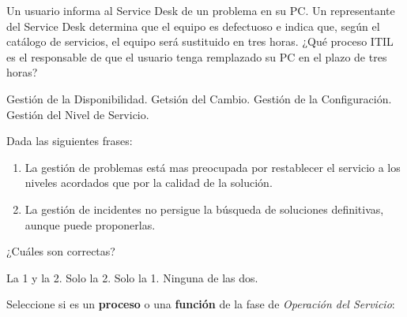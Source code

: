 \documentclass[a4paper]{exam}
\begin{document}
\begin{questions}
  \question Un usuario informa al Service Desk de un problema en su
  PC. Un representante del Service Desk determina que el equipo es
  defectuoso e indica que, según el catálogo de servicios, el equipo
  será sustituido en tres horas. ¿Qué proceso ITIL es el responsable
  de que el usuario tenga remplazado su PC en el plazo de tres horas?

  \begin{checkboxes}
    \choice Gestión de la Disponibilidad.
    \CorrectChoice Getsión del Cambio.
    \choice Gestión de la Configuración.
    \choice Gestión del Nivel de Servicio.
  \end{checkboxes}

  \question Dada las siguientes frases:

  \begin{enumerate}
  \item La gestión de problemas está mas preocupada por restablecer el
    servicio a los niveles acordados que por la calidad de la
    solución.
  \item La gestión de incidentes no persigue la búsqueda de soluciones
    definitivas, aunque puede proponerlas.
  \end{enumerate}

  ¿Cuáles son correctas?

  \begin{choices}
    \choice La 1 y la 2.
    \CorrectChoice Solo la 2.
    \choice Solo la 1.
    \choice Ninguna de las dos.
  \end{choices}

  \question Seleccione si es un \textbf{proceso} o una \textbf{función} de la fase de
  \emph{Operación del Servicio}:


\end{questions}
\end{document}
